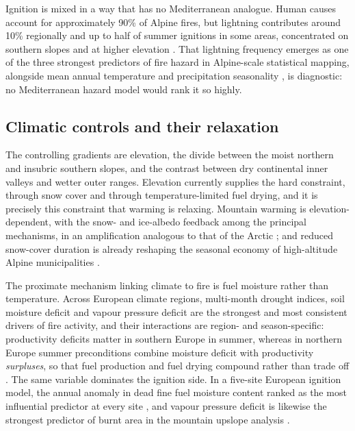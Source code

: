 \documentclass[11pt,a4paper]{article}
\begin{document}
Ignition is mixed in a way that has no Mediterranean analogue. Human causes account for approximately 90\% of Alpine fires, but lightning contributes around 10\% regionally and up to half of summer ignitions in some areas, concentrated on southern slopes and at higher elevation \citep{muller_forest_2020, valese_wildfires_2011}. That lightning frequency emerges as one of the three strongest predictors of fire hazard in Alpine-scale statistical mapping, alongside mean annual temperature and precipitation seasonality \citep{gerberding_mapping_2025}, is diagnostic: no Mediterranean hazard model would rank it so highly.

\subsection{Climatic controls and their relaxation}

The controlling gradients are elevation, the divide between the moist northern and insubric southern slopes, and the contrast between dry continental inner valleys and wetter outer ranges. Elevation currently supplies the hard constraint, through snow cover and through temperature-limited fuel drying, and it is precisely this constraint that warming is relaxing. Mountain warming is elevation-dependent, with the snow- and ice-albedo feedback among the principal mechanisms, in an amplification analogous to that of the Arctic \citep{rangwala_climate_2012}; and reduced snow-cover duration is already reshaping the seasonal economy of high-altitude Alpine municipalities \citep{pede_mountain_2022}.

The proximate mechanism linking climate to fire is fuel moisture rather than temperature. Across European climate regions, multi-month drought indices, soil moisture deficit and vapour pressure deficit are the strongest and most consistent drivers of fire activity, and their interactions are region- and season-specific: productivity deficits matter in southern Europe in summer, whereas in northern Europe summer preconditions combine moisture deficit with productivity \emph{surpluses}, so that fuel production and fuel drying compound rather than trade off \citep{miller_compounding_2025}. The same variable dominates the ignition side. In a five-site European ignition model, the annual anomaly in dead fine fuel moisture content ranked as the most influential predictor at every site \citep{gelabert_assessing_2025}, and vapour pressure deficit is likewise the strongest predictor of burnt area in the mountain upslope analysis \citep{beloiu_climatedriven_2026}.
\end{document}
